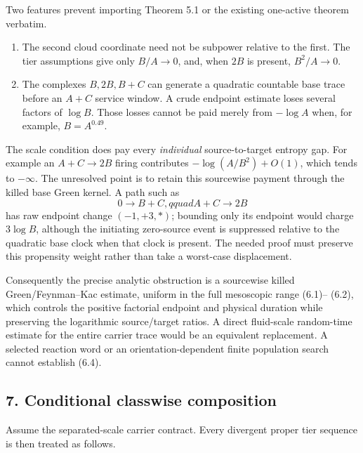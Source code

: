 Two features prevent importing Theorem 5.1 or the existing one-active
theorem verbatim.

\begin{enumerate}
\def\labelenumi{\arabic{enumi}.}
\tightlist
\item
  The second cloud coordinate need not be subpower relative to the
  first. The tier assumptions give only \(B/A\to0\), and, when \(2B\) is
  present, \(B^2/A\to0\).
\item
  The complexes \(B,2B,B+C\) can generate a quadratic countable base
  trace before an \(A+C\) service window. A crude endpoint estimate
  loses several factors of \(\log B\). Those losses cannot be paid
  merely from \(-\log A\) when, for example, \(B=A^{0.49}\).
\end{enumerate}

The scale condition does pay every \emph{individual} source-to-target
entropy gap. For example an \(A+C\to 2B\) firing contributes
\(-\log(A/B^2)+O(1)\), which tends to \(-\infty\). The unresolved point
is to retain this sourcewise payment through the killed base Green
kernel. A path such as \[
                  0\longrightarrow B+C,qquad A+C\longrightarrow2B
                                                                    \tag{6.8}
\] has raw endpoint change \((-1,+3,\ast)\); bounding only its endpoint
would charge \(3\log B\), although the initiating zero-source event is
suppressed relative to the quadratic base clock when that clock is
present. The needed proof must preserve this propensity weight rather
than take a worst-case displacement.

Consequently the precise analytic obstruction is a sourcewise killed
Green/Feynman--Kac estimate, uniform in the full mesoscopic range
(6.1)-- (6.2), which controls the positive factorial endpoint and
physical duration while preserving the logarithmic source/target ratios.
A direct fluid-scale random-time estimate for the entire carrier trace
would be an equivalent replacement. A selected reaction word or an
orientation-dependent finite population search cannot establish (6.4).

\subsection{7. Conditional classwise
composition}

Assume the separated-scale carrier contract. Every divergent proper tier
sequence is then treated as follows.

